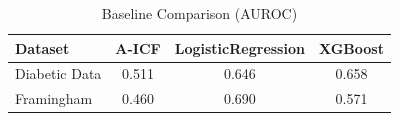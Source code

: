 \begin{table}[H]
\centering
\caption{Baseline Comparison (AUROC)}
\label{tab:baseline_comparison}
\begin{tabular}{lccc}
\toprule
Dataset & A-ICF & LogisticRegression & XGBoost \\
\midrule
Diabetic Data & 0.511 & 0.646 & 0.658 \\
Framingham & 0.460 & 0.690 & 0.571 \\
\bottomrule
\end{tabular}
\end{table}
